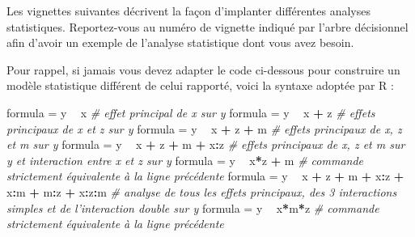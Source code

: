 \documentclass[
]{book}
\newenvironment{Shaded}{\begin{snugshade}}{\end{snugshade}}
\newcommand{\CommentTok}[1]{\textcolor[rgb]{0.56,0.35,0.01}{\textit{#1}}}
\newcommand{\NormalTok}[1]{#1}
\newcommand{\OperatorTok}[1]{\textcolor[rgb]{0.81,0.36,0.00}{\textbf{#1}}}
\newcommand{\StringTok}[1]{\textcolor[rgb]{0.31,0.60,0.02}{#1}}
\begin{document}
Les vignettes suivantes décrivent la façon d'implanter différentes analyses statistiques. Reportez-vous au numéro de vignette indiqué par l'arbre décisionnel afin d'avoir un exemple de l'analyse statistique dont vous avez besoin.

Pour rappel, si jamais vous devez adapter le code ci-dessous pour construire un modèle statistique différent de celui rapporté, voici la syntaxe adoptée par R :

\begin{Shaded}
\begin{Highlighting}[]
\NormalTok{formula =}\StringTok{ }\NormalTok{y }\OperatorTok{~}\StringTok{ }\NormalTok{x }\CommentTok{# effet principal de x sur y }
\NormalTok{formula =}\StringTok{ }\NormalTok{y }\OperatorTok{~}\StringTok{ }\NormalTok{x }\OperatorTok{+}\StringTok{ }\NormalTok{z }\CommentTok{# effets principaux de x et z sur y }
\NormalTok{formula =}\StringTok{ }\NormalTok{y }\OperatorTok{~}\StringTok{ }\NormalTok{x }\OperatorTok{+}\StringTok{ }\NormalTok{z }\OperatorTok{+}\StringTok{ }\NormalTok{m }\CommentTok{# effets principaux de x, z et m sur y }
\NormalTok{formula =}\StringTok{ }\NormalTok{y }\OperatorTok{~}\StringTok{ }\NormalTok{x }\OperatorTok{+}\StringTok{ }\NormalTok{z }\OperatorTok{+}\StringTok{ }\NormalTok{m }\OperatorTok{+}\StringTok{ }\NormalTok{x}\OperatorTok{:}\NormalTok{z }\CommentTok{# effets principaux de x, z et m sur y et interaction entre x et z sur y}
\NormalTok{formula =}\StringTok{ }\NormalTok{y }\OperatorTok{~}\StringTok{ }\NormalTok{x}\OperatorTok{*}\NormalTok{z }\OperatorTok{+}\StringTok{ }\NormalTok{m }\CommentTok{# commande strictement équivalente à la ligne précédente}
\NormalTok{formula =}\StringTok{ }\NormalTok{y }\OperatorTok{~}\StringTok{ }\NormalTok{x }\OperatorTok{+}\StringTok{ }\NormalTok{z }\OperatorTok{+}\StringTok{ }\NormalTok{m }\OperatorTok{+}\StringTok{ }\NormalTok{x}\OperatorTok{:}\NormalTok{z }\OperatorTok{+}\StringTok{ }\NormalTok{x}\OperatorTok{:}\NormalTok{m }\OperatorTok{+}\StringTok{ }\NormalTok{m}\OperatorTok{:}\NormalTok{z }\OperatorTok{+}\StringTok{ }\NormalTok{x}\OperatorTok{:}\NormalTok{z}\OperatorTok{:}\NormalTok{m }\CommentTok{# analyse de tous les effets principaux, des 3 interactions simples et de l'interaction double sur y}
\NormalTok{formula =}\StringTok{ }\NormalTok{y }\OperatorTok{~}\StringTok{ }\NormalTok{x}\OperatorTok{*}\NormalTok{m}\OperatorTok{*}\NormalTok{z }\CommentTok{# commande strictement équivalente à la ligne précédente}
\end{Highlighting}
\end{Shaded}
\end{document}
